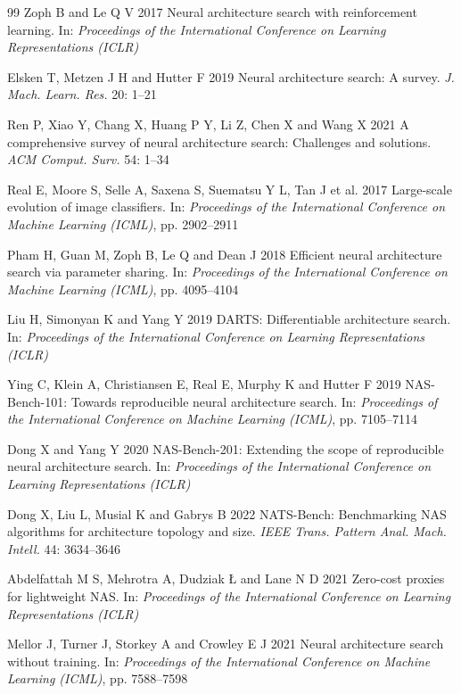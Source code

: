 \documentclass{sadhana}
\begin{document}
\begin{thebibliography}{99}
 Zoph B and Le Q V 2017 Neural architecture search with reinforcement learning. In: \textit{Proceedings of the International Conference on Learning Representations (ICLR)}

 Elsken T, Metzen J H and Hutter F 2019 Neural architecture search: A survey. \textit{J. Mach. Learn. Res.} 20: 1--21

 Ren P, Xiao Y, Chang X, Huang P Y, Li Z, Chen X and Wang X 2021 A comprehensive survey of neural architecture search: Challenges and solutions. \textit{ACM Comput. Surv.} 54: 1--34

 Real E, Moore S, Selle A, Saxena S, Suematsu Y L, Tan J et al. 2017 Large-scale evolution of image classifiers. In: \textit{Proceedings of the International Conference on Machine Learning (ICML)}, pp. 2902--2911

 Pham H, Guan M, Zoph B, Le Q and Dean J 2018 Efficient neural architecture search via parameter sharing. In: \textit{Proceedings of the International Conference on Machine Learning (ICML)}, pp. 4095--4104

 Liu H, Simonyan K and Yang Y 2019 DARTS: Differentiable architecture search. In: \textit{Proceedings of the International Conference on Learning Representations (ICLR)}

 Ying C, Klein A, Christiansen E, Real E, Murphy K and Hutter F 2019 NAS-Bench-101: Towards reproducible neural architecture search. In: \textit{Proceedings of the International Conference on Machine Learning (ICML)}, pp. 7105--7114

 Dong X and Yang Y 2020 NAS-Bench-201: Extending the scope of reproducible neural architecture search. In: \textit{Proceedings of the International Conference on Learning Representations (ICLR)}

 Dong X, Liu L, Musial K and Gabrys B 2022 NATS-Bench: Benchmarking NAS algorithms for architecture topology and size. \textit{IEEE Trans. Pattern Anal. Mach. Intell.} 44: 3634--3646

 Abdelfattah M S, Mehrotra A, Dudziak \L{} and Lane N D 2021 Zero-cost proxies for lightweight NAS. In: \textit{Proceedings of the International Conference on Learning Representations (ICLR)}

 Mellor J, Turner J, Storkey A and Crowley E J 2021 Neural architecture search without training. In: \textit{Proceedings of the International Conference on Machine Learning (ICML)}, pp. 7588--7598


\end{thebibliography}
\end{document}
